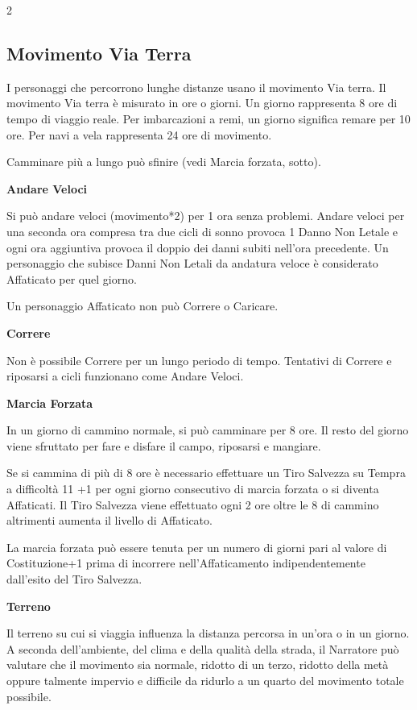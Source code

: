 \begin{multicols}{2}
\subsection{Movimento Via Terra}\label{movimentoviaterra}

I personaggi che percorrono lunghe distanze usano il movimento Via terra. Il movimento Via terra è misurato in ore o giorni. Un giorno rappresenta 8 ore di tempo di viaggio reale. Per imbarcazioni a remi, un giorno significa remare per 10 ore. Per navi a vela rappresenta 24 ore di movimento.

Camminare più a lungo può sfinire (vedi Marcia forzata, sotto).

\textbf{Andare Veloci}\label{andareveloci}

Si può andare veloci (movimento*2) per 1 ora senza problemi. Andare veloci per una seconda ora compresa tra due cicli di sonno provoca 1 Danno Non Letale e ogni ora aggiuntiva provoca il doppio dei danni subiti nell'ora precedente. Un personaggio che subisce Danni Non Letali da andatura veloce è considerato Affaticato per quel giorno.

Un personaggio Affaticato non può Correre o Caricare.

\textbf{Correre}\label{correre}

Non è possibile Correre per un lungo periodo di tempo. Tentativi di Correre e riposarsi a cicli funzionano come Andare Veloci.

\textbf{Marcia Forzata}\label{marciaforzata}

In un giorno di cammino normale, si può camminare per 8 ore. Il resto del giorno viene sfruttato per fare e disfare il campo, riposarsi e mangiare.

Se si cammina di più di 8 ore è necessario effettuare un Tiro Salvezza su Tempra a difficoltà 11 +1 per ogni giorno consecutivo di marcia forzata o si diventa Affaticati. Il Tiro Salvezza viene effettuato ogni 2 ore oltre le 8 di cammino altrimenti aumenta il livello di Affaticato.

La marcia forzata può essere tenuta per un numero di giorni pari al valore di Costituzione+1 prima di incorrere nell'Affaticamento indipendentemente dall'esito del Tiro Salvezza.

\textbf{Terreno}\label{terreno}

Il terreno su cui si viaggia influenza la distanza percorsa in un'ora o in un giorno. A seconda dell'ambiente, del clima e della qualità della strada, il Narratore può valutare che il movimento sia normale, ridotto di un terzo, ridotto della metà oppure talmente impervio e difficile da ridurlo a un quarto del movimento totale possibile.


\end{multicols}
